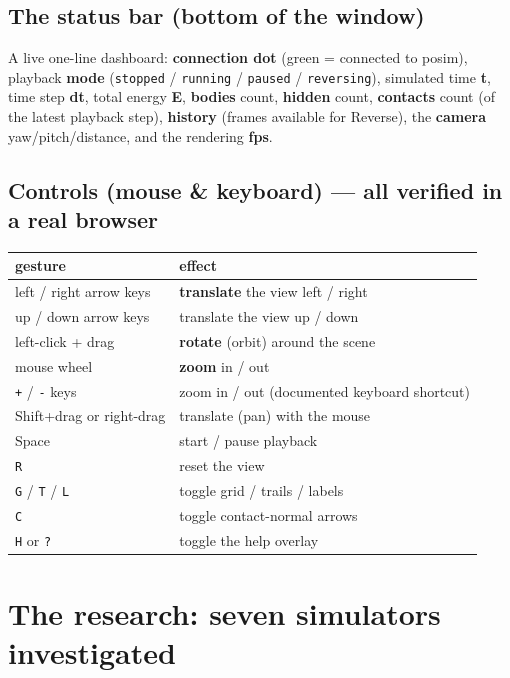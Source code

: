 \documentclass[11pt]{article}
\newcommand{\code}[1]{\texttt{#1}}
\begin{document}
\subsection{The status bar (bottom of the window)}

A live one-line dashboard: \textbf{connection dot} (green = connected
to posim), playback \textbf{mode} (\code{stopped} / \code{running} /
\code{paused} / \code{reversing}), simulated time \textbf{t}, time
step \textbf{dt}, total energy \textbf{E}, \textbf{bodies} count,
\textbf{hidden} count, \textbf{contacts} count (of the latest playback
step), \textbf{history} (frames available for
Reverse), the \textbf{camera} yaw/pitch/distance, and the rendering
\textbf{fps}.

\subsection{Controls (mouse \& keyboard) --- all verified in a real
browser}

\begin{center}
\begin{tabular}{lp{8.6cm}}
\textbf{gesture} & \textbf{effect}\\\hline
left / right arrow keys & \textbf{translate} the view left / right\\
up / down arrow keys & translate the view up / down\\
left-click + drag & \textbf{rotate} (orbit) around the scene\\
mouse wheel & \textbf{zoom} in / out\\
\code{+} / \code{-} keys & zoom in / out (documented keyboard shortcut)\\
Shift+drag or right-drag & translate (pan) with the mouse\\
Space & start / pause playback\\
\code{R} & reset the view\\
\code{G} / \code{T} / \code{L} & toggle grid / trails / labels\\
\code{C} & toggle contact-normal arrows\\
\code{H} or \code{?} & toggle the help overlay\\
\end{tabular}
\end{center}

\section{The research: seven simulators investigated}
\end{document}
